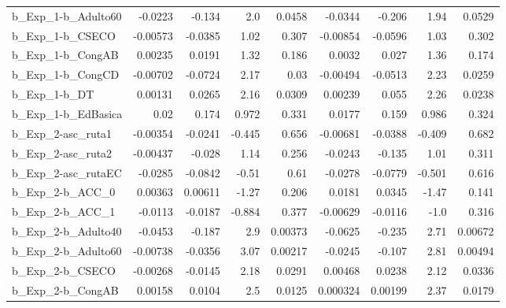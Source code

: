 \begin{tabular}{lrrrrrrrr}
b\_Exp\_1-b\_Adulto60         &     -0.0223 &       -0.134 &       2.0 &   0.0458 &    -0.0344 &      -0.206 &         1.94 &        0.0529 \\
b\_Exp\_1-b\_CSECO            &    -0.00573 &      -0.0385 &      1.02 &    0.307 &   -0.00854 &     -0.0596 &         1.03 &         0.302 \\
b\_Exp\_1-b\_CongAB           &     0.00235 &       0.0191 &      1.32 &    0.186 &     0.0032 &       0.027 &         1.36 &         0.174 \\
b\_Exp\_1-b\_CongCD           &    -0.00702 &      -0.0724 &      2.17 &     0.03 &   -0.00494 &     -0.0513 &         2.23 &        0.0259 \\
b\_Exp\_1-b\_DT               &     0.00131 &       0.0265 &      2.16 &   0.0309 &    0.00239 &       0.055 &         2.26 &        0.0238 \\
b\_Exp\_1-b\_EdBasica         &        0.02 &        0.174 &     0.972 &    0.331 &     0.0177 &       0.159 &        0.986 &         0.324 \\
b\_Exp\_2-asc\_ruta1          &    -0.00354 &      -0.0241 &    -0.445 &    0.656 &   -0.00681 &     -0.0388 &       -0.409 &         0.682 \\
b\_Exp\_2-asc\_ruta2          &    -0.00437 &       -0.028 &      1.14 &    0.256 &    -0.0243 &      -0.135 &         1.01 &         0.311 \\
b\_Exp\_2-asc\_rutaEC         &     -0.0285 &      -0.0842 &     -0.51 &     0.61 &    -0.0278 &     -0.0779 &       -0.501 &         0.616 \\
b\_Exp\_2-b\_ACC\_0            &     0.00363 &      0.00611 &     -1.27 &    0.206 &     0.0181 &      0.0345 &        -1.47 &         0.141 \\
b\_Exp\_2-b\_ACC\_1            &     -0.0113 &      -0.0187 &    -0.884 &    0.377 &   -0.00629 &     -0.0116 &         -1.0 &         0.316 \\
b\_Exp\_2-b\_Adulto40         &     -0.0453 &       -0.187 &       2.9 &  0.00373 &    -0.0625 &      -0.235 &         2.71 &       0.00672 \\
b\_Exp\_2-b\_Adulto60         &    -0.00738 &      -0.0356 &      3.07 &  0.00217 &    -0.0245 &      -0.107 &         2.81 &       0.00494 \\
b\_Exp\_2-b\_CSECO            &    -0.00268 &      -0.0145 &      2.18 &   0.0291 &    0.00468 &      0.0238 &         2.12 &        0.0336 \\
b\_Exp\_2-b\_CongAB           &     0.00158 &       0.0104 &       2.5 &   0.0125 &   0.000324 &     0.00199 &         2.37 &        0.0179 \\

\end{tabular}
